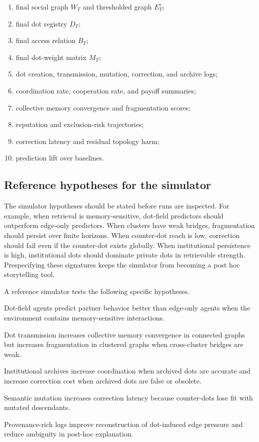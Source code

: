 \documentclass[11pt]{article}
\theoremstyle{remark}
\begin{document}
\begin{enumerate}[leftmargin=*]
\item final social graph $W_T$ and thresholded graph $E_T^\tau$;
\item final dot registry $D_T$;
\item final access relation $B_T$;
\item final dot-weight matrix $M_T$;
\item dot creation, transmission, mutation, correction, and archive logs;
\item coordination rate, cooperation rate, and payoff summaries;
\item collective memory convergence and fragmentation scores;
\item reputation and exclusion-risk trajectories;
\item correction latency and residual topology harm;
\item prediction lift over baselines.
\end{enumerate}

\subsection{Reference hypotheses for the simulator}\label{reference-hypotheses-simulator}

The simulator hypotheses should be stated before runs are inspected. For example, when retrieval is memory-sensitive, dot-field predictors should outperform edge-only predictors. When clusters have weak bridges, fragmentation should persist over finite horizons. When counter-dot reach is low, correction should fail even if the counter-dot exists globally. When institutional persistence is high, institutional dots should dominate private dots in retrievable strength. Prespecifying these signatures keeps the simulator from becoming a post hoc storytelling tool.


A reference simulator tests the following specific hypotheses.

\begin{description}[leftmargin=2.5cm,style=nextline]
\item[S1] Dot-field agents predict partner behavior better than edge-only
agents when the environment contains memory-sensitive interactions.

\item[S2] Dot transmission increases collective memory convergence in
connected graphs but increases fragmentation in clustered graphs when
cross-cluster bridges are weak.

\item[S3] Institutional archives increase coordination when archived dots
are accurate and increase correction cost when archived dots are false or
obsolete.

\item[S4] Semantic mutation increases correction latency because
counter-dots lose fit with mutated descendants.

\item[S5] Provenance-rich logs improve reconstruction of dot-induced
edge pressure and reduce ambiguity in post-hoc explanation.
\end{description}
\end{document}
